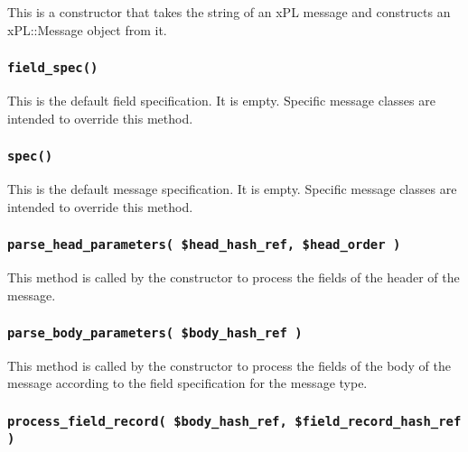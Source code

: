 This is a constructor that takes the string of an xPL message and
constructs an xPL::Message object from it.

\subsubsection*{\texttt{field\_spec()}\label{xPL::Message_field_spec_}}


This is the default field specification.  It is empty.  Specific
message classes are intended to override this method.

\subsubsection*{\texttt{spec()}\label{xPL::Message_spec_}}


This is the default message specification.  It is empty.  Specific
message classes are intended to override this method.

\subsubsection*{\texttt{parse\_head\_parameters( \$head\_hash\_ref, \$head\_order )}\label{xPL::Message_parse_head_parameters_head_hash_ref_head_order_}}


This method is called by the constructor to process the fields of the
header of the message.

\subsubsection*{\texttt{parse\_body\_parameters( \$body\_hash\_ref )}\label{xPL::Message_parse_body_parameters_body_hash_ref_}}


This method is called by the constructor to process the fields of the
body of the message according to the field specification for the
message type.

\subsubsection*{\texttt{process\_field\_record( \$body\_hash\_ref, \$field\_record\_hash\_ref )}\label{xPL::Message_process_field_record_body_hash_ref_field_record_hash_ref_}}


